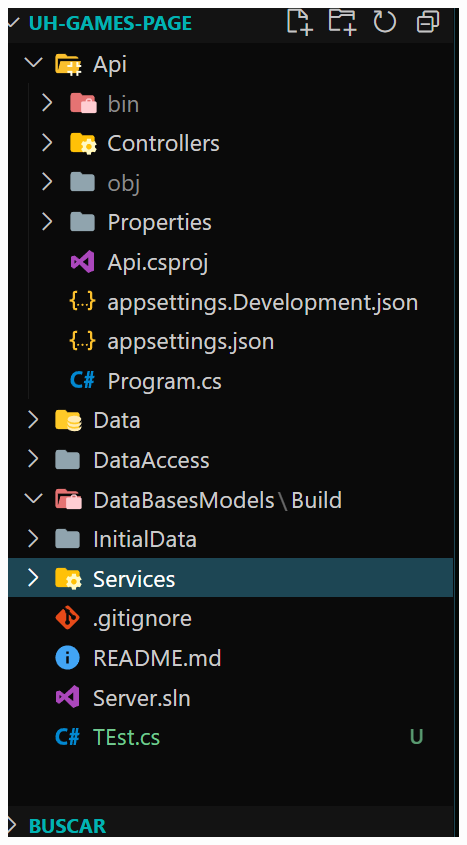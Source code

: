 \documentclass{article} %
\begin{document}
  \includegraphics[width=\textwidth, max height=\textheight, keepaspectratio]{Captura de pantalla 2023-11-04 171245.png}
\end{document}
